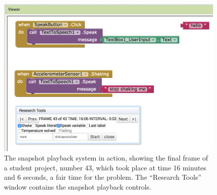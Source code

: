 \begin{figure}
  \centering
      \includegraphics[width=\textwidth]{images/ch3-playback}
  \caption[Snapshot Playback]{The snapshot playback system in action, showing the final frame of a student project, number 43, which took place at time 16 minutes and 6 seconds, a fair time for the problem. The ``Research Tools'' window contains the snapshot playback controls.}
  \label{img:playback}
\end{figure}
